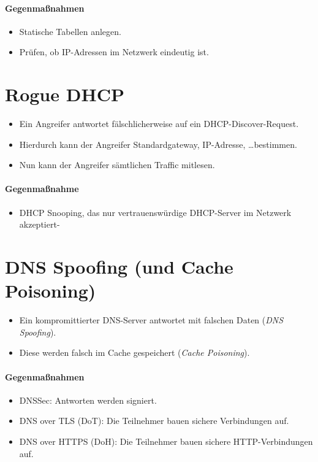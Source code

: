 \documentclass[a4paper, 11pt, accentcolor = tud3b]{tudreport}
\begin{document}
	        \paragraph{Gegenmaßnahmen}
		        \begin{itemize}
		        	\item Statische Tabellen anlegen.
		        	\item Prüfen, ob IP-Adressen im Netzwerk eindeutig ist.
		        \end{itemize}

        \section{Rogue DHCP}
            \begin{itemize}
            	\item Ein Angreifer antwortet fälschlicherweise auf ein DHCP-Discover-Request.
            	\item Hierdurch kann der Angreifer Standardgateway, IP-Adresse, \dots bestimmen.
            	\item Nun kann der Angreifer sämtlichen Traffic mitlesen.
            \end{itemize}
        
	        \paragraph{Gegenmaßnahme}
		        \begin{itemize}
		        	\item DHCP Snooping, das nur vertrauenswürdige DHCP-Server im Netzwerk akzeptiert-
		        \end{itemize}

        \section{DNS Spoofing (und Cache Poisoning)}
            \begin{itemize}
            	\item Ein kompromittierter DNS-Server antwortet mit falschen Daten (\textit{DNS Spoofing}).
            	\item Diese werden falsch im Cache gespeichert (\textit{Cache Poisoning}).
            \end{itemize}

            \paragraph{Gegenmaßnahmen}
                \begin{itemize}
                	\item DNSSec: Antworten werden signiert.
                	\item DNS over TLS (DoT): Die Teilnehmer bauen sichere Verbindungen auf.
                	\item DNS over HTTPS (DoH): Die Teilnehmer bauen sichere HTTP-Verbindungen auf.
                \end{itemize}
\end{document}
